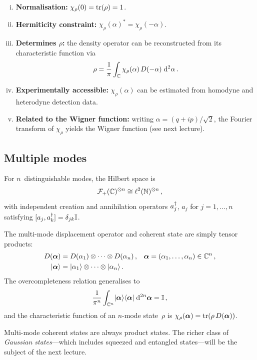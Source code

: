 \begin{keyresult}
  \leavevmode
  \begin{enumerate}[(i)]
    \item \textbf{Normalisation:} $\chi_\rho(0) = \operatorname{tr}(\rho) = 1$.
    \item \textbf{Hermiticity constraint:}
      $\chi_\rho(\alpha)^* = \chi_\rho(-\alpha)$.
    \item \textbf{Determines $\rho$:} the density operator can be
      reconstructed from its characteristic function via
      \begin{equation}\label{eq:rho-from-chi}
        \rho = \frac{1}{\pi}\int_{\mathbb{C}}
          \chi_\rho(\alpha)\, D(-\alpha)\;\mathrm{d}^2\alpha\,.
      \end{equation}
    \item \textbf{Experimentally accessible:} $\chi_\rho(\alpha)$ can
      be estimated from homodyne and heterodyne detection data.
    \item \textbf{Related to the Wigner function:} writing
      $\alpha = (q + ip)/\sqrt{2}$, the Fourier transform of
      $\chi_\rho$ yields the Wigner function (see next lecture).
  \end{enumerate}
\end{keyresult}

\subsection{Multiple modes}\label{sec:multiple-modes}

For $n$~distinguishable modes, the Hilbert space is
\begin{equation}\label{eq:multi-mode-hilb}
  \mathcal{F}_+(\mathbb{C})^{\otimes n}
  \cong \ell^2(\mathbb{N})^{\otimes n}\,,
\end{equation}
with independent creation and annihilation operators $a_j^\dagger$, $a_j$
for $j = 1,\ldots,n$ satisfying $[a_j, a_k^\dagger] = \delta_{jk}\mathbb{I}$.

The multi-mode displacement operator and coherent state are simply
tensor products:
\begin{align}
  D(\boldsymbol{\alpha})
  &= D(\alpha_1) \otimes \cdots \otimes D(\alpha_n)\,,
  &\boldsymbol{\alpha} &= (\alpha_1,\ldots,\alpha_n) \in \mathbb{C}^n\,,
  \label{eq:multi-mode-disp}\\
  \lvert \boldsymbol{\alpha} \rangle
  &= \lvert \alpha_1 \rangle \otimes \cdots \otimes \lvert \alpha_n \rangle\,.
  \label{eq:multi-mode-coherent}
\end{align}
The overcompleteness relation generalises to
\begin{equation}\label{eq:multi-mode-completeness}
  \frac{1}{\pi^n}\int_{\mathbb{C}^n}
    \lvert \boldsymbol{\alpha} \rangle\langle \boldsymbol{\alpha} \rvert\;\mathrm{d}^{2n}\boldsymbol{\alpha} = \mathbb{I}\,,
\end{equation}
and the characteristic function of an $n$-mode state~$\rho$ is
$\chi_\rho(\boldsymbol{\alpha}) = \operatorname{tr}(\rho\, D(\boldsymbol{\alpha}))$.

\begin{remark}
  Multi-mode coherent states are always product states.  The richer
  class of \emph{Gaussian states}---which includes squeezed and
  entangled states---will be the subject of the next lecture.
\end{remark}
